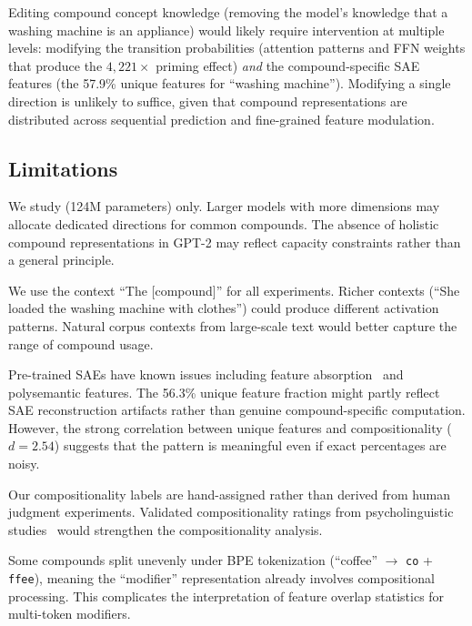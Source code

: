 Editing compound concept knowledge (\eg removing the model's knowledge that a washing machine is an appliance) would likely require intervention at multiple levels: modifying the transition probabilities (attention patterns and FFN weights that produce the $4{,}221\times$ priming effect) \emph{and} the compound-specific SAE features (the 57.9\% unique features for ``washing machine'').
Modifying a single direction is unlikely to suffice, given that compound representations are distributed across sequential prediction and fine-grained feature modulation.

\subsection{Limitations}

We study \gpttwo (124M parameters) only.
Larger models with more dimensions may allocate dedicated directions for common compounds.
The absence of holistic compound representations in GPT-2 may reflect capacity constraints rather than a general principle.

We use the context ``The [compound]'' for all experiments.
Richer contexts (\eg ``She loaded the washing machine with clothes'') could produce different activation patterns.
Natural corpus contexts from large-scale text would better capture the range of compound usage.

Pre-trained SAEs have known issues including feature absorption~\citep{chanin2024absorption} and polysemantic features.
The 56.3\% unique feature fraction might partly reflect SAE reconstruction artifacts rather than genuine compound-specific computation.
However, the strong correlation between unique features and compositionality ($d = 2.54$) suggests that the pattern is meaningful even if exact percentages are noisy.

Our compositionality labels are hand-assigned rather than derived from human judgment experiments.
Validated compositionality ratings from psycholinguistic studies~\citep{reddy2011empirical} would strengthen the compositionality analysis.

Some compounds split unevenly under BPE tokenization (\eg ``coffee'' $\to$ \texttt{co} + \texttt{ffee}), meaning the ``modifier'' representation already involves compositional processing.
This complicates the interpretation of feature overlap statistics for multi-token modifiers.
